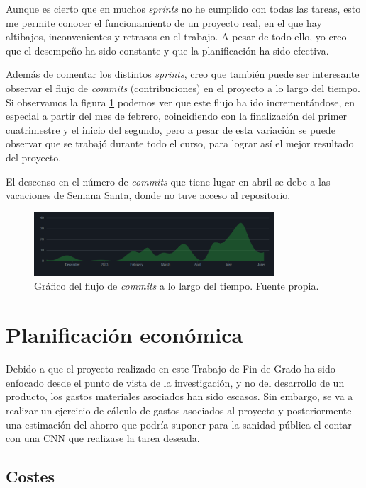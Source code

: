 Aunque es cierto que en muchos \textit{sprints} no he cumplido con todas las tareas, esto me permite conocer el funcionamiento de un proyecto real, en el que hay altibajos, inconvenientes y retrasos en el trabajo. A pesar de todo ello, yo creo que el desempeño ha sido constante y que la planificación ha sido efectiva.

Además de comentar los distintos \textit{sprints}, creo que también puede ser interesante observar el flujo de \textit{commits} (contribuciones) en el proyecto a lo largo del tiempo. Si observamos la figura \ref{fig:flujo} podemos ver que este flujo ha ido incrementándose, en especial a partir del mes de febrero, coincidiendo con la finalización del primer cuatrimestre y el inicio del segundo, pero a pesar de esta variación se puede observar que se trabajó durante todo el curso, para lograr así el mejor resultado del proyecto.

El descenso en el número de \textit{commits} que tiene lugar en abril se debe a las vacaciones de Semana Santa, donde no tuve acceso al repositorio. 

\begin{figure}[h]
    \centering
    \includegraphics[width=0.8\textwidth]{img/commits_flujo.png}
    \caption{Gráfico del flujo de \textit{commits} a lo largo del tiempo. Fuente propia.}
    \label{fig:flujo}
\end{figure}

\section{Planificación económica}

Debido a que el proyecto realizado en este Trabajo de Fin de Grado ha sido enfocado desde el punto de vista de la investigación, y no del desarrollo de un producto, los gastos materiales asociados han sido escasos. Sin embargo, se va a realizar un ejercicio de cálculo de gastos asociados al proyecto y posteriormente una estimación del ahorro que podría suponer para la sanidad pública el contar con una CNN que realizase la tarea deseada.

\subsection{Costes}


